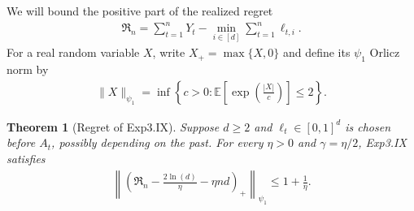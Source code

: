 \documentclass{article}
\theoremstyle{plain}
\newtheorem{theorem}{Theorem}
\theoremstyle{definition}
\newcommand{\Reg}{\mathfrak{R}}
\newcommand{\E}{\mathbb E}
\newcommand{\expthreeix}{\textsf{Exp3.IX}\xspace}
\begin{document}
We will bound the positive part of the realized regret
\begin{align*}
    \Reg_n = \sum_{t=1}^n Y_t-\min_{i\in[d]}\sum_{t=1}^n\ell_{t,i}.
\end{align*}
For a real random variable $X$, write $X_+=\max\{X,0\}$ and define
its $\psi_1$ Orlicz norm by
\begin{align*}
    \|X\|_{\psi_1}
    = \inf\left\{c>0:\E\left[\exp\left(\frac{|X|}{c}\right)\right]\leq 2\right\}.
\end{align*}
\begin{theorem}[Regret of \expthreeix]\label{thm:expthreeix}
    Suppose $d\geq 2$ and $\ell_t\in[0,1]^d$ is chosen before $A_t$,
    possibly depending on the past.
    For every $\eta>0$ and $\gamma=\eta/2$, \expthreeix satisfies
    \begin{align*}
        \left\|
        \left(\Reg_n-\frac{2\ln(d)}{\eta}-\eta nd\right)_+
        \right\|_{\psi_1}
        \leq 1+\frac{1}{\eta}.
    \end{align*}
\end{theorem}
\end{document}
